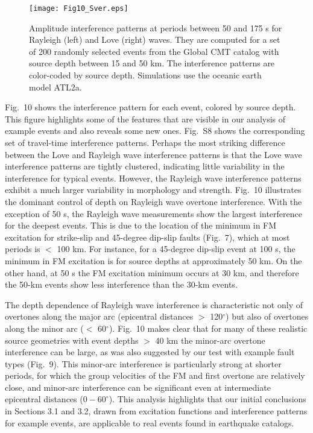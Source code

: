 \documentclass[extra,mreferee]{gji}
\begin{document}
\begin{figure}
 \texttt{[image: Fig10\_Sver.eps]}
 \caption{Amplitude interference patterns at periods between 50 and 175 s for Rayleigh (left) and Love (right) waves. They are computed for a set of 200 randomly selected events from the Global CMT catalog with source depth between 15 and 50 km. The interference patterns are color-coded by source depth. Simulations use the oceanic earth model ATL2a.}
\end{figure}

Fig.\ 10 shows the interference pattern for each event, colored by source depth. This figure highlights some of the features that are visible in our analysis of example events and also reveals some new ones. Fig.\ S8 shows the corresponding set of travel-time interference patterns. Perhaps the most striking difference between the Love and Rayleigh wave interference patterns is that the Love wave interference patterns are tightly clustered, indicating little variability in the interference for typical events. However, the Rayleigh wave interference patterns exhibit a much larger variability in morphology and strength. Fig.\ 10 illustrates the dominant control of depth on Rayleigh wave overtone interference. With the exception of 50 s, the Rayleigh wave measurements show the largest interference for the deepest events. This is due to the location of the minimum in FM excitation for strike-slip and 45-degree dip-slip faults (Fig.\ 7), which at most periods is $<$ 100 km. For instance, for a 45-degree dip-slip event at 100 s, the minimum in FM excitation is for source depths at approximately 50 km. On the other hand, at 50 s the FM excitation minimum occurs at 30 km, and therefore the 50-km events show less interference than the 30-km events. 

The depth dependence of Rayleigh wave interference is characteristic not only of overtones along the major arc (epicentral distances $>$ 120$^\circ$) but also of overtones along the minor arc ($<$ 60$^\circ$). Fig.\ 10 makes clear that for many of these realistic source geometries with event depths $>$ 40 km the minor-arc overtone interference can be large, as was also suggested by our test with example fault types (Fig.\ 9). This minor-arc interference is particularly strong at shorter periods, for which the group velocities of the FM and first overtone are relatively close, and minor-arc interference can be significant even at intermediate epicentral distances ($0-60^\circ$). This analysis highlights that our initial conclusions in Sections 3.1 and 3.2, drawn from excitation functions and interference patterns for example events, are applicable to real events found in earthquake catalogs.
\end{document}
